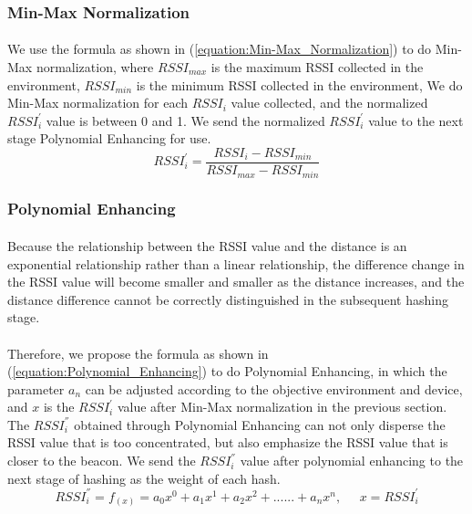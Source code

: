 \documentclass[a4paper,12pt]{report}
\begin{document}
\subsubsection{Min-Max Normalization}
\paragraph{}
We use the formula as shown in (\ref{equation:Min-Max_Normalization}) to do Min-Max normalization, where $RSSI_{max}$ is the maximum RSSI collected in the environment, $RSSI_{min}$ is the minimum RSSI collected in the environment, We do Min-Max normalization for each $RSSI_i$ value collected, and the normalized $RSSI_i^{'}$ value is between 0 and 1. We send the normalized $RSSI_i^{'}$ value to the next stage Polynomial Enhancing for use.
\begin{equation}
\label{equation:Min-Max_Normalization}
{RSSI}_i^{'}=\frac{{RSSI}_i-{RSSI}_{min}}{{RSSI}_{max}-{RSSI}_{min}}
\end{equation}

\subsubsection{Polynomial Enhancing}
\paragraph{}
Because the relationship between the RSSI value and the distance is an exponential relationship rather than a linear relationship, the difference change in the RSSI value will become smaller and smaller as the distance increases, and the distance difference cannot be correctly distinguished in the subsequent hashing stage.
%

\paragraph{}
Therefore, we propose the formula as shown in (\ref{equation:Polynomial_Enhancing}) to do Polynomial Enhancing, in which the parameter $a_n$ can be adjusted according to the objective environment and device, and $x$ is the $RSSI_i^{'}$ value after Min-Max normalization in the previous section. The $RSSI_i^{''}$ obtained through Polynomial Enhancing can not only disperse the RSSI value that is too concentrated, but also emphasize the RSSI value that is closer to the beacon. We send the $RSSI_i^{''}$ value after polynomial enhancing to the next stage of hashing as the weight of each hash.
\begin{equation}
\label{equation:Polynomial_Enhancing}
RSSI_i^{''} = f_(x) = a_0 x^0 + a_1 x^1 + a_2 x^2 + ...... + a_n x^n , \;\;\;\;\; x= RSSI_i^{'}
\end{equation}
\end{document}
